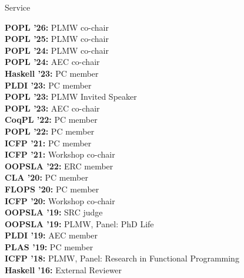 \documentclass{resume} %
\begin{document}

\newcommand{\serve}[2]{
  {\bf #1:} #2 \\
  }


\begin{rSection}{Service}

  \serve{POPL '26}{PLMW co-chair}
  \serve{POPL '25}{PLMW co-chair}
  \serve{POPL '24}{PLMW co-chair}
  \serve{POPL '24}{AEC co-chair}  
  \serve{Haskell '23}{PC member}  
  \serve{PLDI '23}{PC member}
  \serve{POPL '23}{PLMW Invited Speaker}  
  \serve{POPL '23}{AEC co-chair}
  \serve{CoqPL '22}{PC member}
  \serve{POPL '22}{PC member}
  \serve{ICFP '21}{PC member}
  \serve{ICFP '21}{Workshop co-chair}
  \serve{OOPSLA '22}{ERC member}
  \serve{CLA '20}{PC member}
  \serve{FLOPS '20}{PC member}
  \serve{ICFP '20}{Workshop co-chair}
  \serve{OOPSLA '19}{SRC judge}
  \serve{OOPSLA '19}{PLMW, Panel: PhD Life}
  \serve{PLDI '19}{AEC member}
  \serve{PLAS '19}{PC member}
  \serve{ICFP '18}{PLMW, Panel: Research in Functional Programming}
  \serve{Haskell '16}{External Reviewer}
  
\end{rSection}

\end{document}
